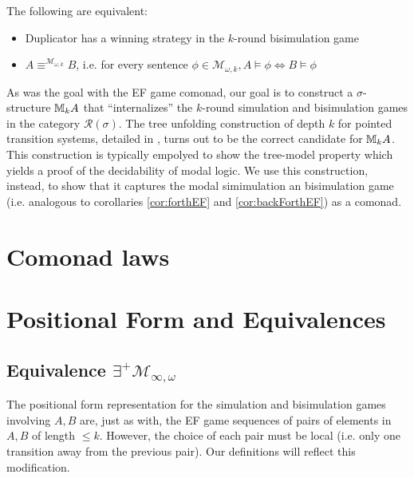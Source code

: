 \begin{prop}
The following are equivalent:
\begin{itemize}
\item Duplicator has a winning strategy in the $k$-round bisimulation game 
\item $A \equiv^{\mathcal{M}_{\omega,k}} B$, i.e. for every sentence $\phi \in \mathcal{M}_{\omega,k}, A \vDash \phi \Leftrightarrow B \vDash \phi$
\end{itemize}
\end{prop}
As was the goal with the EF game comonad, our goal is to construct a $\sigma$-structure ${\mathbb{M}_{k}A}$ that ``internalizes'' the $k$-round simulation and bisimulation games in the category $\mathcal{R}(\sigma)$. The tree unfolding construction of depth $k$ for pointed transition systems, detailed in \cite{Gradel2014}, turns out to be the correct candidate for ${\mathbb{M}_{k}A}$. This construction is typically empolyed to show the tree-model property which yields a proof of the decidability of modal logic. We use this construction, instead, to show that it captures the modal simimulation an bisimulation game (i.e. analogous to corollaries \ref{cor:forthEF} and \ref{cor:backForthEF}) as a comonad.
\section{Comonad laws}
\section{Positional Form and Equivalences}
\subsection{Equivalence $\exists^{+}\mathcal{M}_{\infty,\omega}$}
The positional form representation for the simulation and bisimulation games involving $A,B$ are, just as with, the EF game sequences of pairs of elements in $A,B$ of length $\leq k$. However, the choice of each pair must be local (i.e. only one transition away from the previous pair). Our definitions will reflect this modification. \\~\\


